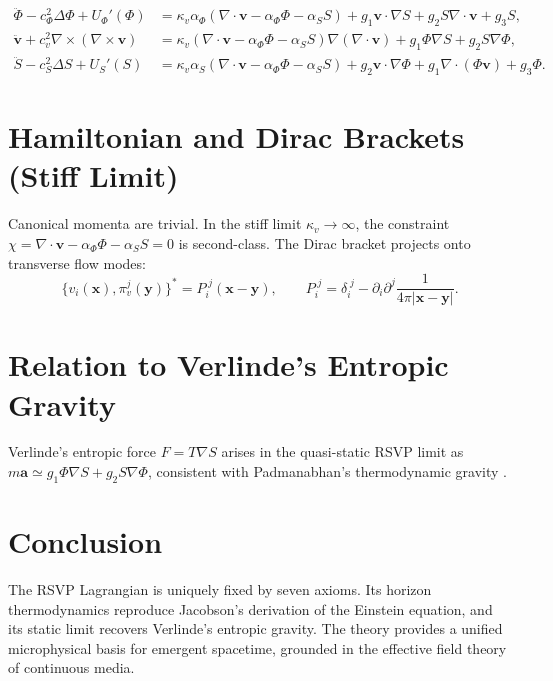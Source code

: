 \documentclass[11pt,a4paper]{article}
\begin{document}
\begin{align}
\boxed{\ddot{\Phi} - c_\Phi^2\Delta\Phi + U_\Phi'(\Phi)}
&= \kappa_v\alpha_\Phi(\nabla\!\cdot\!\mathbf{v}-\alpha_\Phi\Phi-\alpha_S S) + g_1\mathbf{v}\!\cdot\!\nabla S + g_2 S\nabla\!\cdot\!\mathbf{v} + g_3 S, \\[8pt]
\boxed{\ddot{\mathbf{v}} + c_v^2\nabla\!\times\!(\nabla\!\times\!\mathbf{v})}
&= \kappa_v(\nabla\!\cdot\!\mathbf{v}-\alpha_\Phi\Phi-\alpha_S S)\nabla(\nabla\!\cdot\!\mathbf{v}) + g_1\Phi\nabla S + g_2 S\nabla\Phi, \\[8pt]
\boxed{\ddot{S} - c_S^2\Delta S + U_S'(S)}
&= \kappa_v\alpha_S(\nabla\!\cdot\!\mathbf{v}-\alpha_\Phi\Phi-\alpha_S S) + g_2\mathbf{v}\!\cdot\!\nabla\Phi + g_1\nabla\!\cdot\!(\Phi\mathbf{v}) + g_3\Phi.
\end{align}

\section{Hamiltonian and Dirac Brackets (Stiff Limit)}

Canonical momenta are trivial. In the stiff limit $\kappa_v\to\infty$, the constraint $\chi = \nabla\!\cdot\!\mathbf{v} - \alpha_\Phi\Phi - \alpha_S S = 0$ is second-class. The Dirac bracket \cite{dirac1964,henneaux1992} projects onto transverse flow modes:
\[
\{v_i(\mathbf{x}),\pi_v^j(\mathbf{y})\}^* = P_i^{\;j}(\mathbf{x}-\mathbf{y}),
\qquad
P_i^{\;j} = \delta_i^{\;j} - \partial_i\partial^j\frac{1}{4\pi|\mathbf{x}-\mathbf{y}|}.
\]

\section{Relation to Verlinde’s Entropic Gravity}

Verlinde’s entropic force \cite{verlinde2011} $F = T\nabla S$ arises in the quasi-static RSVP limit as $m\mathbf{a} \simeq g_1\Phi\nabla S + g_2 S\nabla\Phi$, consistent with Padmanabhan’s thermodynamic gravity \cite{padmanabhan2005}.

\section{Conclusion}

The RSVP Lagrangian is uniquely fixed by seven axioms. Its horizon thermodynamics reproduce Jacobson’s derivation of the Einstein equation, and its static limit recovers Verlinde’s entropic gravity. The theory provides a unified microphysical basis for emergent spacetime, grounded in the effective field theory of continuous media.
\end{document}
